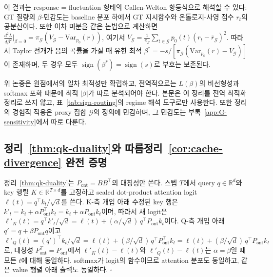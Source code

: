 이 결과는 response = fluctuation 형태의 Callen-Welton 항등식으로 해석할 수 있다: GT 질량의 $\beta$-민감도는 baseline 분포 하에서 GT 지시함수와 온톨로지-사영 점수 $r_t$의 공분산이다. 또한 이차 미분을 같은 논법으로 계산하면 $\frac{d^2 L}{d\beta^2}\big|_{\beta=0} = \pi_{\mathcal{G}}(V_{\mathcal{G}} - \mathrm{Var}_{p_0}(r))$, 여기서 $V_{\mathcal{G}} = \frac{1}{\pi_{\mathcal{G}}}\sum_{t\in\mathcal{G}} p_0(t)(r_t - \bar r_{\mathcal{G}})^2$. 따라서 Taylor 전개가 음의 곡률을 가질 때 유한 최적 $\beta^* = -s / [\pi_{\mathcal{G}}(\mathrm{Var}_{p_0}(r) - V_{\mathcal{G}})]$이 존재하며, 두 경우 모두 $\operatorname{sign}(\beta^*) = \operatorname{sign}(s)$로 부호는 보존된다.

위 논증은 원점에서의 일차 최적성만 확립하고, 전역적으로는 $L(\beta)$의 비선형성과 softmax 포화 때문에 최적 $|\beta|$가 따로 분석되어야 한다. 본문은 이 정리를 전역 최적화 정리로 쓰지 않고, 표~\ref{tab:sign-routing}의 regime 해석 도구로만 사용한다. 또한 정리의 경험적 적용은 proxy 집합 $\mathcal{G}$의 정의에 민감하며, 그 민감도는 부록~\ref{app:G-sensitivity}에서 따로 다룬다.

\subsection{정리~\ref{thm:qk-duality}와 따름정리~\ref{cor:cache-divergence} 완전 증명}\label{app:proof:qk-duality}

정리~\ref{thm:qk-duality}는 $P_{\mathrm{ont}} = BB^\top$의 대칭성만 쓴다. 스텝 $T$에서 query $q\in\mathbb{R}^d$와 key 행렬 $K\in\mathbb{R}^{T\times d}$를 고정하고 scaled dot-product attention logit $\ell(t) = q^\top k_t/\sqrt d$를 쓴다. K-측 개입 아래 수정된 key 행은 $k'_t = k_t + \alpha P_{\mathrm{ont}}^\top k_t = k_t + \alpha P_{\mathrm{ont}} k_t$이며, 따라서 새 logit은 $\ell'_K(t) = q^\top k'_t/\sqrt d = \ell(t) + (\alpha/\sqrt d)\, q^\top P_{\mathrm{ont}} k_t$이다. Q-측 개입 아래 $q' = q + \beta P_{\mathrm{ont}} q$이고 $\ell'_Q(t) = (q')^\top k_t/\sqrt d = \ell(t) + (\beta/\sqrt d)\, q^\top P_{\mathrm{ont}}^\top k_t = \ell(t) + (\beta/\sqrt d)\, q^\top P_{\mathrm{ont}} k_t$로, 대칭성 $P_{\mathrm{ont}}^\top = P_{\mathrm{ont}}$에서 $\ell'_K(t) - \ell(t)$와 $\ell'_Q(t) - \ell(t)$는 $\alpha=\beta$일 때 모든 $t$에 대해 동일하다. softmax가 logit의 함수이므로 attention 분포도 동일하고, 같은 value 행렬 아래 출력도 동일하다. $\square$

